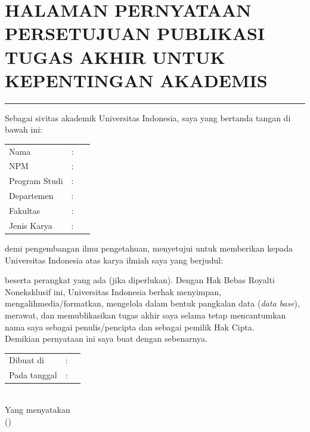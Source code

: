 %
%

\chapter*{\normalsize HALAMAN PERNYATAAN PERSETUJUAN PUBLIKASI TUGAS AKHIR UNTUK KEPENTINGAN AKADEMIS}

\vspace{-0.6cm}

\noindent \rule{15cm}{3pt}

\begin{singlespace}
\vspace*{0.2cm}
\noindent
Sebagai sivitas akademik Universitas Indonesia, saya yang bertanda
tangan di bawah ini:

\begin{flushleft}

\begin{tabular}{lcl}
	Nama & : & \penulis \\ 	
	NPM & : & \npm \\
	Program Studi & : & \jenjang~\bidang\\
	Departemen & : & \departemen\\	
	Fakultas & : & \fakultas\\
	Jenis Karya & : & \type \\
\end{tabular}
\end{flushleft}

\noindent demi pengembangan ilmu pengetahuan, menyetujui untuk memberikan
kepada Universitas Indonesia  atas karya ilmiah saya yang berjudul:
\begin{center}
	\judul
\end{center}
beserta perangkat yang ada (jika diperlukan). Dengan Hak Bebas Royalti
Noneksklusif ini, Universitas Indonesia berhak menyimpan,
mengalihmedia/formatkan, mengelola dalam bentuk pangkalan data
(\textit{data base}), merawat, dan memublikasikan tugas akhir saya selama
tetap mencantumkan nama saya sebagai penulis/pencipta dan sebagai
pemilik Hak Cipta. \\

\noindent Demikian pernyataan ini saya buat dengan sebenarnya.

\begin{center}
	\vspace*{0.8cm}
	\begin{tabular}{lll}
		Dibuat di&: & \kota \\
		Pada tanggal&: & \tanggalPengesahan \\
	\end{tabular}\\

	\vspace*{0.2cm}
	Yang menyatakan \\
	\vspace*{2cm}
	(\penulis)
\end{center}
\end{singlespace}

\newpage

